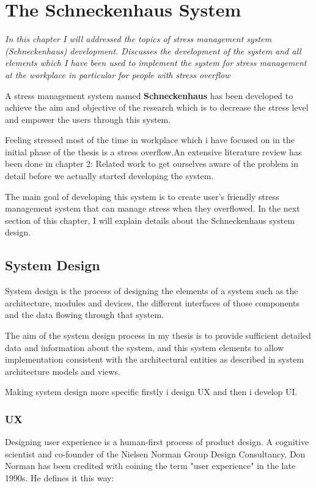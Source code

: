 \chapter{The Schneckenhaus System}
\textit{In this chapter I will addressed  the  topics of stress management system (Schneckenhaus) development. Discusses the development of the system and all elements which I have been used to implement the system for stress management at the  workplace  in  particular  for people with stress overflow}
\vspace{5mm}

A stress management system named \textbf{Schneckenhaus} has been developed to achieve the aim and objective of the research which is to decrease the stress level and empower the users through this system. 

Feeling stressed most of the time in workplace which i have focused on in the initial phase of the thesis is a stress overflow.An extensive literature review has been done in chapter 2: Related work to get ourselves aware of the problem in detail before we actually started developing the system.

The main goal of developing this system is to create user's friendly stress management system  that can manage stress when they overflowed. In the next section of this chapter, I will explain details about the Schneckenhaus system design.

\section{System Design}
System design is the process of designing the elements of a system such as the architecture, modules and devices, the different interfaces of those components and the data flowing through that system. 

The aim of the system design process in my thesis is to provide sufficient detailed data and information about the system, and this system elements to allow implementation consistent with the architectural entities as described in system architecture models and views.

Making system design more specific firstly i design \acf{UX} and then i develop \acf{UI}.
\subsection*{\acf{UX}}
Designing user experience is a human-first process of product design. A cognitive scientist and co-founder of the Nielsen Norman Group Design Consultancy, Don Norman has been credited with coining the term "user experience" in the late 1990s. He defines it this way:

